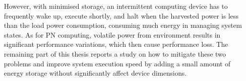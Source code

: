 However, with minimised storage, an intermittent computing device has to frequently wake up, execute shortly, and halt when the harvested power is less than the load power consumption, consuming much energy in managing system states. As for PN computing, volatile power from environment results in significant performance variations, which then cause performance loss. The remaining part of this thesis reports a study on how to mitigate these two problems and improve system execution speed by adding a small amount of energy storage without significantly affect device dimensions. 
